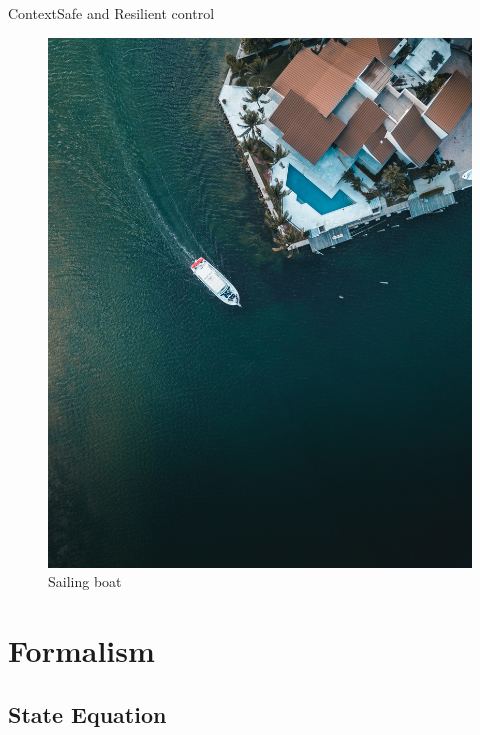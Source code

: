\documentclass[9pt, xcolor={usenames, dvipsnames}]{beamer}
\begin{document}
\begin{frame}{Context}{Safe and Resilient control}
\begin{minipage}[c]{0.35\textwidth}
\begin{figure}
						\includegraphics[width=\textwidth, trim=100 0 200 0, clip]{images/boat_view.jpg}
						\caption{Sailing boat}
					\end{figure}
				\end{minipage}
			\end{frame}

	\section{Formalism}

		\subsection{State Equation}
\end{document}
